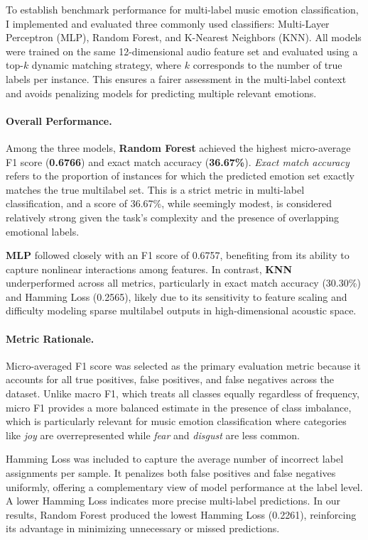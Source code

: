 \documentclass{article}
\begin{document}
To establish benchmark performance for multi-label music emotion classification, I implemented and evaluated three commonly used classifiers: Multi-Layer Perceptron (MLP), Random Forest, and K-Nearest Neighbors (KNN). All models were trained on the same 12-dimensional audio feature set and evaluated using a top-$k$ dynamic matching strategy, where $k$ corresponds to the number of true labels per instance. This ensures a fairer assessment in the multi-label context and avoids penalizing models for predicting multiple relevant emotions.

\paragraph{Overall Performance.}
Among the three models, \textbf{Random Forest} achieved the highest micro-average F1 score (\textbf{0.6766}) and exact match accuracy (\textbf{36.67\%}). \textit{Exact match accuracy} refers to the proportion of instances for which the predicted emotion set exactly matches the true multilabel set. This is a strict metric in multi-label classification, and a score of 36.67\%, while seemingly modest, is considered relatively strong given the task's complexity and the presence of overlapping emotional labels.

\textbf{MLP} followed closely with an F1 score of 0.6757, benefiting from its ability to capture nonlinear interactions among features. In contrast, \textbf{KNN} underperformed across all metrics, particularly in exact match accuracy (30.30\%) and Hamming Loss (0.2565), likely due to its sensitivity to feature scaling and difficulty modeling sparse multilabel outputs in high-dimensional acoustic space.

\paragraph{Metric Rationale.}
Micro-averaged F1 score was selected as the primary evaluation metric because it accounts for all true positives, false positives, and false negatives across the dataset. Unlike macro F1, which treats all classes equally regardless of frequency, micro F1 provides a more balanced estimate in the presence of class imbalance, which is particularly relevant for music emotion classification where categories like \textit{joy} are overrepresented while \textit{fear} and \textit{disgust} are less common.

Hamming Loss was included to capture the average number of incorrect label assignments per sample. It penalizes both false positives and false negatives uniformly, offering a complementary view of model performance at the label level. A lower Hamming Loss indicates more precise multi-label predictions. In our results, Random Forest produced the lowest Hamming Loss (0.2261), reinforcing its advantage in minimizing unnecessary or missed predictions.
\end{document}

